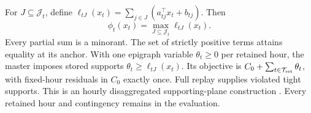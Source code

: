 \documentclass[10pt,journal]{IEEEtran}
\begin{document}
For $J\subseteq\mathcal J_t$, define $\ell_{tJ}(x_t)=\sum_{j\in J}(a_{tj}^\top x_t+b_{tj})$. Then
\begin{equation}
\phi_t(x_t)=\max_{J\subseteq\mathcal J_t}\ell_{tJ}(x_t).
\label{eq:support}
\end{equation}
Every partial sum is a minorant. The set of strictly positive terms attains equality at its anchor. With one epigraph variable $\theta_t\geq0$ per retained hour, the master imposes stored supports $\theta_t\geq\ell_{tJ}(x_t)$. Its objective is $C_0+\sum_{t\in\mathcal T_{\rm ret}}\theta_t$, with fixed-hour residuals in $C_0$ exactly once. Full replay supplies violated tight supports. This is an hourly disaggregated supporting-plane construction \cite{Kelley1960,BirgeLouveaux1988}. Every retained hour and contingency remains in the evaluation.
\end{document}
